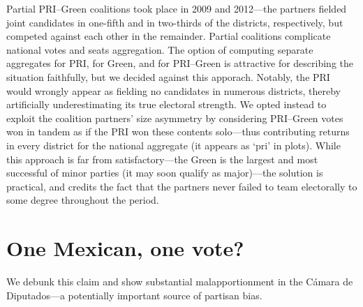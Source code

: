 \documentclass[letter,12pt]{article}
\begin{document}
Partial PRI--Green coalitions took place in 2009 and 2012---the partners fielded joint candidates in one-fifth and in two-thirds of the districts, respectively, but competed against each other in the remainder. Partial coalitions complicate national votes and seats aggregation. The option of computing separate aggregates for PRI, for Green, and for PRI--Green is attractive for describing the situation faithfully, but we decided against this apporach. Notably, the PRI would wrongly appear as fielding no candidates in numerous districts, thereby artificially underestimating its true electoral strength. We opted instead to exploit the coalition partners' size asymmetry by considering PRI--Green votes won in tandem as if the PRI won these contents solo---thus contributing returns in every district for the national aggregate (it appears as `pri' in plots). While this approach is far from satisfactory---the Green is the largest and most successful of minor parties (it may soon qualify as major)---the solution is practical, and credits the fact that the partners never failed to team electorally to some degree throughout the period. 

\section{One Mexican, one vote?}


We debunk this claim and show substantial malapportionment in the C\'amara de Diputados---a potentially important source of partisan bias. 
\end{document}
